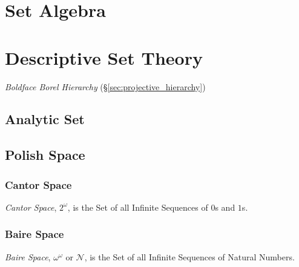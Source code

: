 \section{Set Algebra}\label{sec:set_algebra}



\section{Descriptive Set Theory}\label{sec:descriptive_set_theory}

\emph{Boldface Borel Hierarchy} (\S\ref{sec:projective_hierarchy})

\subsection{Analytic Set}\label{sec:analytic_set}

\subsection{Polish Space}\label{sec:polish_space}

\subsubsection{Cantor Space}\label{sec:cantor_space}

\emph{Cantor Space}, $2^{\omega}$, is the Set of all Infinite
Sequences of $0$s and $1$s.



\subsubsection{Baire Space}\label{sec:baire_space}

\emph{Baire Space}, $\omega^{\omega}$ or $\mathcal{N}$, is the Set of
all Infinite Sequences of Natural Numbers.



